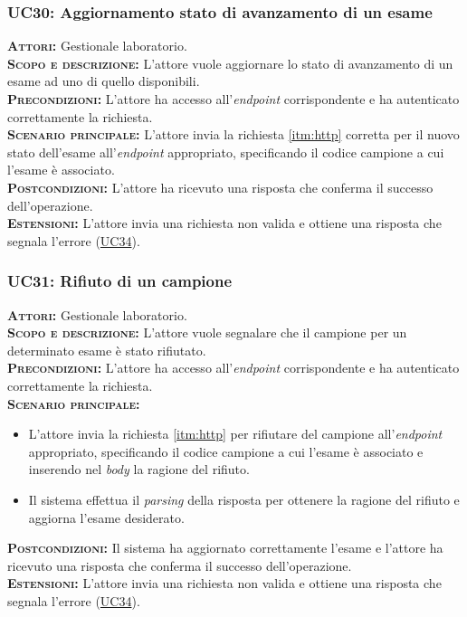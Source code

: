 \subsubsection{UC30: Aggiornamento stato di avanzamento di un esame}
\label{sec:UC30}
\textsc{\textbf{Attori:}} Gestionale laboratorio.\\
\textsc{\textbf{Scopo e descrizione:}} L'attore vuole aggiornare lo stato di avanzamento di un esame ad uno di quello disponibili.\\
\textsc{\textsc{\textbf{Precondizioni:}}} L'attore ha accesso all'\textit{endpoint} corrispondente e ha autenticato correttamente la richiesta.\\
\textsc{\textbf{Scenario principale:}}  L'attore invia la richiesta \ref{itm:http} corretta per il nuovo stato dell'esame all'\textit{endpoint} appropriato, specificando il codice campione a cui l'esame è associato.\\
\textsc{\textbf{Postcondizioni:}} L'attore ha ricevuto una risposta che conferma il successo dell'operazione.\\
\textsc{\textbf{Estensioni:}} L'attore invia una richiesta non valida e ottiene una risposta che segnala l'errore (\hyperref[sec:UC34]{UC34}).

\subsubsection{UC31: Rifiuto di un campione}
\label{sec:UC31}
\textsc{\textbf{Attori:}} Gestionale laboratorio.\\
\textsc{\textbf{Scopo e descrizione:}} L'attore vuole segnalare che il campione per un determinato esame è stato rifiutato.\\
\textsc{\textsc{\textbf{Precondizioni:}}} L'attore ha accesso all'\textit{endpoint} corrispondente e ha autenticato correttamente la richiesta.\\
\textsc{\textbf{Scenario principale:}}  
\begin{itemize}
    \item L'attore invia la richiesta \ref{itm:http} per rifiutare del campione all'\textit{endpoint} appropriato, specificando il codice campione a cui l'esame è associato e inserendo nel \textit{body} la ragione del rifiuto.
    \item Il sistema effettua il \textit{parsing} della risposta per ottenere la ragione del rifiuto e aggiorna l'esame desiderato.
\end{itemize}
\textsc{\textbf{Postcondizioni:}} Il sistema ha aggiornato correttamente l'esame e l'attore ha ricevuto una risposta che conferma il successo dell'operazione.\\
\textsc{\textbf{Estensioni:}} L'attore invia una richiesta non valida e ottiene una risposta che segnala l'errore (\hyperref[sec:UC34]{UC34}).


